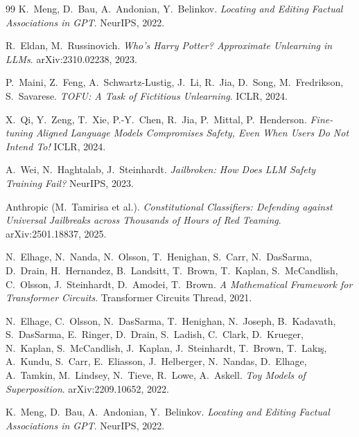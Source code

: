 \documentclass[11pt]{article}
\begin{document}
\begin{thebibliography}{99}
K.~Meng, D.~Bau, A.~Andonian, Y.~Belinkov.
\emph{Locating and Editing Factual Associations in GPT}. NeurIPS, 2022.

R.~Eldan, M.~Russinovich.
\emph{Who's Harry Potter? Approximate Unlearning in LLMs}. arXiv:2310.02238, 2023.

P.~Maini, Z.~Feng, A.~Schwartz-Lustig, J.~Li, R.~Jia, D.~Song, M.~Fredrikson,
S.~Savarese.
\emph{TOFU: A Task of Fictitious Unlearning}. ICLR, 2024.

X.~Qi, Y.~Zeng, T.~Xie, P.-Y.~Chen, R.~Jia, P.~Mittal, P.~Henderson.
\emph{Fine-tuning Aligned Language Models Compromises Safety, Even When Users
Do Not Intend To!} ICLR, 2024.

A.~Wei, N.~Haghtalab, J.~Steinhardt.
\emph{Jailbroken: How Does LLM Safety Training Fail?} NeurIPS, 2023.

Anthropic (M.~Tamirisa et al.).
\emph{Constitutional Classifiers: Defending against Universal Jailbreaks
across Thousands of Hours of Red Teaming}. arXiv:2501.18837, 2025.

N.~Elhage, N.~Nanda, N.~Olsson, T.~Henighan, S.~Carr, N.~DasSarma,
D.~Drain, H.~Hernandez, B.~Landsitt, T.~Brown, T.~Kaplan,
S.~McCandlish, C.~Olsson, J.~Steinhardt, D.~Amodei, T.~Brown.
\emph{A Mathematical Framework for Transformer Circuits}. Transformer
Circuits Thread, 2021.

N.~Elhage, C.~Olsson, N.~DasSarma, T.~Henighan, N.~Joseph, B.~Kadavath,
S.~DasSarma, E.~Ringer, D.~Drain, S.~Ladish, C.~Clark, D.~Krueger,
N.~Kaplan, S.~McCandlish, J.~Kaplan, J.~Steinhardt, T.~Brown,
T.~Lakış, A.~Kundu, S.~Carr, E.~Eliasson, J.~Helberger, N.~Nandas,
D.~Elhage, A.~Tamkin, M.~Lindsey, N.~Tieve, R.~Lowe, A.~Askell.
\emph{Toy Models of Superposition}. arXiv:2209.10652, 2022.

K.~Meng, D.~Bau, A.~Andonian, Y.~Belinkov.
\emph{Locating and Editing Factual Associations in GPT}. NeurIPS, 2022.

\end{thebibliography}
\end{document}
